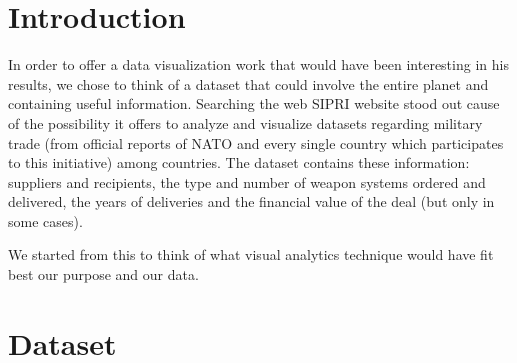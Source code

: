 \documentclass{article}
\begin{document}
\begin{multicols}{2}

\section{Introduction}
%
In order to offer a data visualization work that would have been interesting in his results, we chose to think of a dataset that could involve the entire planet and containing useful information. Searching the web SIPRI website stood out cause of the possibility it offers to analyze and visualize datasets regarding military trade (from official reports of NATO and every single country which participates to this initiative) among countries. The dataset contains these information: suppliers and recipients, the type and number of weapon systems ordered and delivered, the years of deliveries and the financial value of the deal (but only in some cases). 


We started from this to think of what visual analytics technique would have fit best our purpose and our data.



\section{Dataset}
%



\end{multicols}
\end{document}
